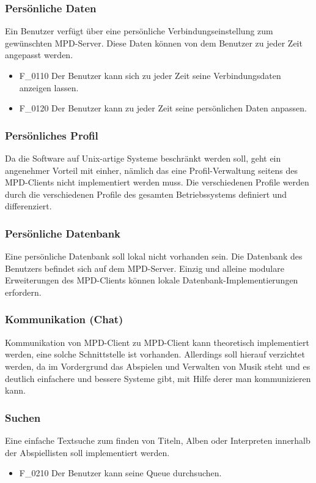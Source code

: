 \subsubsection{Persönliche Daten}
Ein Benutzer verfügt über eine persönliche Verbindungseinstellung zum gewünschten MPD-Server.
Diese Daten können von dem Benutzer zu jeder Zeit angepasst werden.
\begin{itemize}
	\item F\_0110 Der Benutzer kann sich zu jeder Zeit seine Verbindungsdaten anzeigen lassen.
	\item F\_0120 Der Benutzer kann zu jeder Zeit seine persönlichen Daten anpassen.
\end{itemize}
\subsubsection{Persönliches Profil}
Da die Software auf Unix-artige Systeme beschränkt werden soll, geht ein angenehmer Vorteil mit einher, nämlich das
eine Profil-Verwaltung seitens des MPD-Clients nicht implementiert werden muss. Die verschiedenen Profile werden
durch die verschiedenen Profile des gesamten Betriebssystems definiert und differenziert.
\subsubsection{Persönliche Datenbank}
Eine persönliche Datenbank soll lokal nicht vorhanden sein. Die Datenbank des Benutzers befindet sich auf dem MPD-Server.
Einzig und alleine modulare Erweiterungen des MPD-Clients können lokale Datenbank-Implementierungen erfordern.
\subsubsection{Kommunikation (Chat)}
Kommunikation von MPD-Client zu MPD-Client kann theoretisch implementiert werden, eine solche Schnittstelle ist vorhanden.
Allerdings soll hierauf verzichtet werden, da im Vordergrund das Abspielen und Verwalten von Musik steht und es deutlich
einfachere und bessere Systeme gibt, mit Hilfe derer man kommunizieren kann.
\subsubsection{Suchen}
Eine einfache Textsuche zum finden von Titeln, Alben oder Interpreten innerhalb der Abspiellisten soll implementiert werden.
\begin{itemize}
	\item F\_0210 Der Benutzer kann seine Queue durchsuchen.
\end{itemize}
